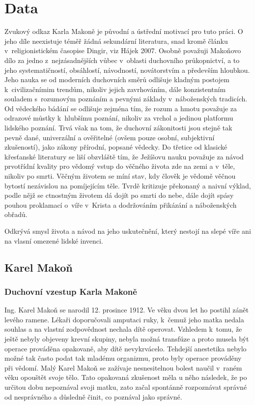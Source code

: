 \chapter{Data}
\label{kap:data}

Zvukový odkaz Karla Makoně je původní a ústřední motivací pro tuto práci. O jeho
díle neexistuje téměř žádná sekundární literatura, snad kromě článku
v~religionistickém časopise Dingir, viz Hájek 2007\cite{hajek2007cesky}. Osobně
považuji Makoňovo dílo za jedno z~nejzásadnějších vůbec v~oblasti duchovního
průkopnictví, a to jeho systematičností, obsáhlostí, návodností, novátorstvím a
především hloubkou. Jeho nauka se od moderních duchovních směrů odlišuje kladným
postojem k~civilizačnímim trendům, nikoliv jejich zavrhováním, dále
konzistentním souladem s~rozumovým poznáním a pevnými základy v~náboženských
tradicích. Od vědeckého bádání se odlišuje zejména tím, že rozum a hmotu
považuje za odrazové můstky k~hlubšímu poznání, nikoliv za vrchol a jedinou
platformu lidského poznání. Trvá však na tom, že duchovní zákonitosti jsou
stejně tak pevně dané, univerzální a ověřitelné (ovšem pouze osobní, subjektivní
zkušeností), jako zákony přírodní, popsané vědecky. Do třetice od klasické
křesťanské literatury se liší obzvláště tím, že Ježíšovu nauku považuje za návod
prvotřídní kvality pro vědomý vstup do věčného života zde na zemi a v~těle,
nikoliv po smrti. Věčným životem se míní stav, kdy člověk je vědomě věčnou
bytostí nezávislou na pomíjejícím těle. Tvrdě kritizuje překonaný a naivní
výklad, podle nějž se ctnostným životem dá dojít po smrti do nebe, dále dojít
spásy pouhou proklamací o~víře v~Krista a dodržováním přikázání a náboženských
obřadů.

Odkrývá smysl života a návod na jeho uskutečnění, který nestojí na slepé víře
ani na vlasní omezené lidské invenci.

\section{Karel Makoň}

\subsection{Duchovní vzestup Karla Makoně}

Ing. Karel Makoň se narodil 12. prosince 1912. Ve věku dvou let ho postihl zánět
levého ramene. Lékaři doporučovali amputaci ruky, k~čemuž jeho matka nedala
souhlas a na vlastní zodpovědnost nechala dítě operovat. Vzhledem k~tomu, že
ještě nebyly objeveny krevní skupiny, nebyla možná transfúze a proto musela být
operace prováděna opakovaně, aby dítě nevykrvácelo. Tehdejší anestetika nebylo
možné tak často podat tak mladému organizmu, proto byly operace prováděny při
vědomí. Malý Karel Makoň se zažívaje nesnesitelnou bolest naučil v~raném věku
opouštět svoje tělo. Tato opakovaná zkušenost měla u něho následek, že po
určitou dobu nepoznával svoji matku, zato začal spontánně rozpoznávat správné od
nesprávného a důsledně činit, co poznával jako správné.

